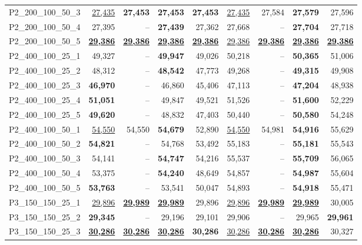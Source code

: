 \documentclass[ppgc,prop-tese,english,formais,babel]{iiufrgs}
\begin{document}
\begin{table}
\begin{tabular}{lrrrrrrrr}
P2\_200\_100\_50\_3 & \underline{27,435} & \textbf{27,453} & \textbf{27,453} & \textbf{27,453} & \underline{27,435} & 27,584 & \textbf{27,579} & 27,596 \\
P2\_200\_100\_50\_4 & 27,395 & -- & \textbf{27,439} & 27,362 & 27,668 & -- & \textbf{27,704} & 27,718 \\
P2\_200\_100\_50\_5 & \underline{\textbf{29,386}} & \underline{\textbf{29,386}} & \underline{\textbf{29,386}} & \underline{\textbf{29,386}} & \underline{29,386} & \underline{\textbf{29,386}} & \underline{\textbf{29,386}} & \underline{\textbf{29,386}} \\
P2\_400\_100\_25\_1 & 49,327 & -- & \textbf{49,947} & 49,026 & 50,218 & -- & \textbf{50,365} & 51,006 \\
P2\_400\_100\_25\_2 & 48,312 & -- & \textbf{48,542} & 47,773 & 49,268 & -- & \textbf{49,315} & 49,908 \\
P2\_400\_100\_25\_3 & \textbf{46,970} & -- & 46,860 & 45,406 & 47,113 & -- & \textbf{47,204} & 48,938 \\
P2\_400\_100\_25\_4 & \textbf{51,051} & -- & 49,847 & 49,521 & 51,526 & -- & \textbf{51,600} & 52,229 \\
P2\_400\_100\_25\_5 & \textbf{49,620} & -- & 48,832 & 47,403 & 50,440 & -- & \textbf{50,580} & 54,248 \\
P2\_400\_100\_50\_1 & \underline{54,550} & 54,550 & \textbf{54,679} & 52,890 & \underline{54,550} & 54,981 & \textbf{54,916} & 55,629 \\
P2\_400\_100\_50\_2 & \textbf{54,821} & -- & 54,768 & 53,492 & 55,183 & -- & \textbf{55,181} & 55,543 \\
P2\_400\_100\_50\_3 & 54,141 & -- & \textbf{54,747} & 54,216 & 55,537 & -- & \textbf{55,709} & 56,065 \\
P2\_400\_100\_50\_4 & 53,375 & -- & \textbf{54,240} & 48,649 & 54,857 & -- & \textbf{54,987} & 55,604 \\
P2\_400\_100\_50\_5 & \textbf{53,763} & -- & 53,541 & 50,047 & 54,893 & -- & \textbf{54,918} & 55,471 \\
P3\_150\_150\_25\_1 & \underline{29,896} & \underline{\textbf{29,989}} & \underline{\textbf{29,989}} & 29,896 & \underline{29,896} & \underline{\textbf{29,989}} & \underline{\textbf{29,989}} & 30,005 \\
P3\_150\_150\_25\_2 & \textbf{29,345} & -- & 29,196 & 29,101 & 29,906 & -- & 29,965 & \textbf{29,961} \\
P3\_150\_150\_25\_3 & \underline{\textbf{30,286}} & \underline{\textbf{30,286}} & \underline{\textbf{30,286}} & \textbf{30,286} & \underline{30,286} & \underline{\textbf{30,286}} & \underline{\textbf{30,286}} & 30,327 \\

\end{tabular}
\end{table}
\end{document}
